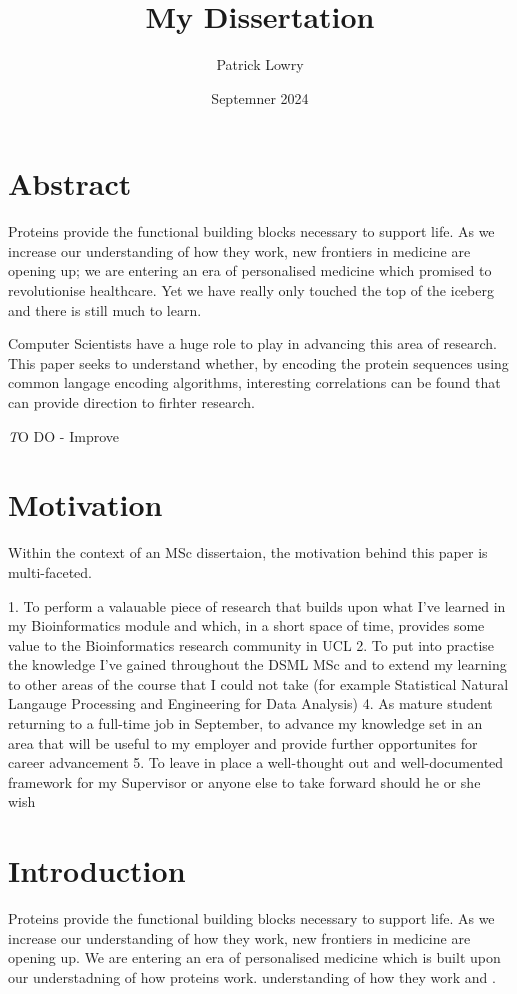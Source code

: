 \documentclass{article}
\title{My Dissertation}
\author{Patrick Lowry}
\date{Septemner 2024}
\begin{document}
\section{Abstract}
Proteins provide the functional building blocks necessary to support life. As we increase our understanding of how they work, new frontiers in medicine are opening up; we are entering an era of personalised medicine which promised to revolutionise healthcare. Yet we have really only touched the top of the iceberg and there is still much to learn.

Computer Scientists have a huge role to play in advancing this area of research. This paper seeks to understand whether, by encoding the protein sequences using common langage encoding algorithms, interesting correlations can be found that can provide direction to firhter research.

\textit TO DO - Improve
\pagebreak
\section{Motivation}
Within the context of an MSc dissertaion, the motivation behind this paper is multi-faceted.

1. To perform a valauable piece of research that builds upon what I've learned in my Bioinformatics module and which, in a short space of time,  provides some value to the Bioinformatics research community in UCL
2. To put into practise the knowledge I've gained throughout the DSML MSc and to extend my learning to other areas of the course that I could not take (for example Statistical Natural Langauge Processing and Engineering for Data Analysis)
4. As mature student returning to a full-time job in September, to advance my knowledge set in an area that will be useful to my employer and provide further opportunites for career advancement
5. To leave in place a well-thought out and well-documented framework for my Supervisor or anyone else to take forward should he or she wish

\pagebreak
\section{Introduction}

Proteins provide the functional building blocks necessary to support life. As we increase our understanding of how they work, new frontiers in medicine are opening up. We are entering an era of personalised medicine which is built upon our understadning of how proteins work. understanding of how they work and . 
\end{document}
